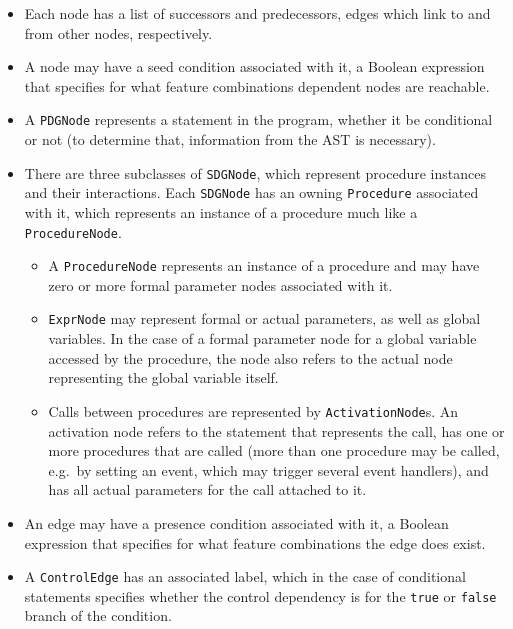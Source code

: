 \begin{itemize}
  \item Each node has a list of successors and predecessors, edges which link to and from other nodes, respectively.
  
  \item A node may have a seed condition associated with it, a Boolean expression that specifies for what feature 
  combinations dependent nodes are reachable.
  
  \item A \lstinline|PDGNode| represents a statement in the program, whether it be conditional or not (to determine 
  that, information from the AST is necessary).
  
  \item There are three subclasses of \lstinline|SDGNode|, which represent procedure instances and their interactions. 
  Each \lstinline|SDGNode| has an owning \lstinline|Procedure| associated with it, which represents an instance of a 
  procedure much like a \lstinline|ProcedureNode|.
  \begin{itemize}
    \item A \lstinline|ProcedureNode| represents an instance of a procedure and may have zero or more formal parameter 
    nodes associated with it.
    
    \item \lstinline|ExprNode| may represent formal or actual parameters, as well as global variables. In the case of a 
    formal parameter node for a global variable accessed by the procedure, the node also refers to the actual node 
    representing the global variable itself.
    
    \item Calls between procedures are represented by \lstinline|ActivationNode|s. An activation node refers to the 
    statement that represents the call, has one or more procedures that are called (more than one procedure may be 
    called, e.g.\ by setting an event, which may trigger several event handlers), and has all actual parameters for the 
    call attached to it.
  \end{itemize}
  
  \item An edge may have a presence condition associated with it, a Boolean expression that specifies for what feature 
  combinations the edge does exist.
  
  \item A \lstinline|ControlEdge| has an associated label, which in the case of conditional statements specifies 
  whether the control dependency is for the \lstinline|true| or \lstinline|false| branch of the condition.
\end{itemize}

